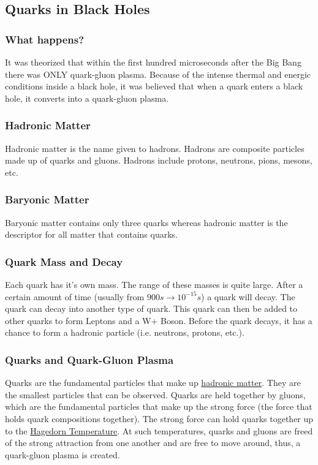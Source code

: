 \documentclass{article}
\begin{document}
\subsection{Quarks in Black Holes}
\subsubsection{What happens?}
It was theorized that within the first hundred microseconds after the Big Bang there was ONLY quark-gluon plasma. Because of the intense thermal and energic conditions inside a black hole, it was believed that when a quark enters a black hole, it converts into a quark-gluon plasma.

\subsubsection{Hadronic Matter}\label{sec:hadronicmatter}
Hadronic matter is the name given to hadrons. Hadrons are composite particles made up of quarks and gluons. Hadrons include protons, neutrons, pions, mesons, etc.

\subsubsection{Baryonic Matter}
Baryonic matter contains only three quarks whereas hadronic matter is the descriptor for all matter that contains quarks.

\subsubsection{Quark Mass and Decay}
Each quark has it's own mass. The range of these masses is quite large. After a certain amount of time (usually from $900s \to 10^{-15}s$) a quark will decay. The quark can decay into another type of quark. This quark can then be added to other quarks to form Leptons and a W+ Boson. Before the quark decays, it has a chance to form a hadronic particle (i.e. neutrons, protons, etc.).

\subsubsection{Quarks and Quark-Gluon Plasma}
Quarks are the fundamental particles that make up \hyperref[sec:hadronicmatter]{hadronic matter}. They are the smallest particles that can be observed. Quarks are held together by gluons, which are the fundamental particles that make up the strong force (the force that holds quark compositions together). The strong force can hold quarks together up to the \hyperref[sec:hagedorntemperature]{Hagedorn Temperature}. At such temperatures, quarks and gluons are freed of the strong attraction from one another and are free to move around, thus, a quark-gluon plasma is created.
\end{document}
